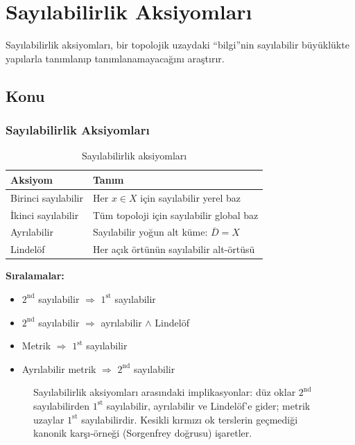 \chapter{Sayılabilirlik Aksiyomları}

Sayılabilirlik aksiyomları, bir topolojik uzaydaki ``bilgi''nin sayılabilir büyüklükte
yapılarla tanımlanıp tanımlanamayacağını araştırır.

\section{Konu}

\subsection{Sayılabilirlik Aksiyomları}

\begin{table}[h]
\centering
\begin{tabular}{ll}
\toprule
\textbf{Aksiyom} & \textbf{Tanım} \\
\midrule
Birinci sayılabilir & Her $x \in X$ için sayılabilir yerel baz \\
İkinci sayılabilir & Tüm topoloji için sayılabilir global baz \\
Ayrılabilir & Sayılabilir yoğun alt küme: $\overline{D} = X$ \\
Lindelöf & Her açık örtünün sayılabilir alt-örtüsü \\
\bottomrule
\end{tabular}
\caption{Sayılabilirlik aksiyomları}
\end{table}

\textbf{Sıralamalar:}
\begin{itemize}
  \item $2^{\text{nd}}$ sayılabilir $\Rightarrow$ $1^{\text{st}}$ sayılabilir
  \item $2^{\text{nd}}$ sayılabilir $\Rightarrow$ ayrılabilir $\wedge$ Lindelöf
  \item Metrik $\Rightarrow$ $1^{\text{st}}$ sayılabilir
  \item Ayrılabilir metrik $\Rightarrow$ $2^{\text{nd}}$ sayılabilir
\end{itemize}

\begin{figure}[ht]
  \centering
  
  \caption{Sayılabilirlik aksiyomları arasındaki implikasyonlar: düz oklar
    $2^{\text{nd}}$ sayılabilirden $1^{\text{st}}$ sayılabilir, ayrılabilir ve
    Lindelöf'e gider; metrik uzaylar $1^{\text{st}}$ sayılabilirdir. Kesikli
    kırmızı ok terslerin geçmediği kanonik karşı-örneği (Sorgenfrey doğrusu)
    işaretler.}
  \label{fig:ch09:implikasyon}
\end{figure}

